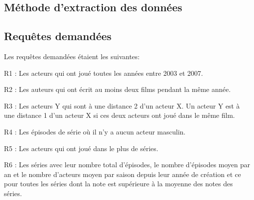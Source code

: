 \documentclass[10pt,a4paper]{article}
\begin{document}
\subsection{Méthode d'extraction des données}

\subsection{Requêtes demandées}
Les requêtes demandées étaient les suivantes:
\begin{list}{-}{}
  \item R1 : Les acteurs qui ont joué toutes les années entre 2003 et
    2007.
  \item R2 : Les auteurs qui ont écrit au moins deux films pendant la
    même année.
  \item R3 : Les acteurs Y qui sont à une distance 2 d'un acteur X. Un
    acteur Y est à une distance 1 d'un acteur X si ces deux acteurs
    ont joué dans le même film.
  \item R4 : Les épisodes de série où il n'y a aucun acteur masculin.
  \item R5 : Les acteurs qui ont joué dans le plus de séries.
  \item R6 : Les séries avec leur nombre total d'épisodes, le nombre
    d'épisodes moyen par an et le nombre d'acteurs moyen par saison
    depuis leur année de création et ce pour toutes les séries dont la
    note est supérieure à la moyenne des notes des séries.
\end{list}
\end{document}

